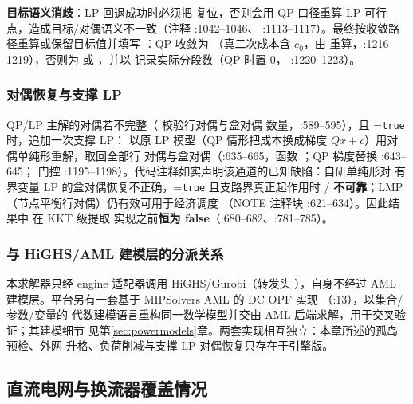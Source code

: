 \textbf{目标语义消歧}：LP 回退成功时必须把  复位，否则会用 QP
口径重算 LP 可行点，造成目标/对偶语义不一致（注释 :1042--1046、
:1113--1117）。最终按收敛路径重算或保留目标值并填写
：QP 收敛为 （真二次成本含 $c_0$，由
 重算，:1216--1219），否则为 
或 ，并以  记录实际分段数（QP 时置 0，
:1220--1223）。

\subsubsection*{对偶恢复与支撑 LP}
QP/LP 主解的对偶若不完整（ 校验行对偶与盒对偶
数量，:589--595），且 =\texttt{true} 时，追加一次支撑 LP：
以原 LP 模型（QP 情形把成本换成梯度 $Qx+c$）用对偶单纯形重解，取回全部行
对偶与盒对偶（:635--665，函数
；QP 梯度替换 :643--645；
门控 :1195--1198）。代码注释如实声明该通道的已知缺陷：自研单纯形对
有界变量 LP 的盒对偶恢复不正确，=\texttt{true}
且支路界真正起作用时 /
\textbf{不可靠}；LMP（节点平衡行对偶）仍有效可用于经济调度
（NOTE 注释块 :621--634）。因此结果中  在 KKT 级提取
实现之前\textbf{恒为 false}（:680--682、:781--785）。

\subsubsection*{与 HiGHS/AML 建模层的分派关系}
本求解器只经 engine 适配器调用 HiGHS/Gurobi（转发头
），自身不经过
AML 建模层。平台另有一套基于 MIPSolvers AML 的 DC OPF 实现
（:13），以集合/参数/变量的
代数建模语言重构同一数学模型并交由 AML 后端求解，用于交叉验证；其建模细节
见第\ref{sec:powermodels}章。两套实现相互独立：本章所述的孤岛预检、外网
升格、负荷削减与支撑 LP 对偶恢复只存在于引擎版。

\subsection{直流电网与换流器覆盖情况}\label{subsec:dcopf-dcgrid}

